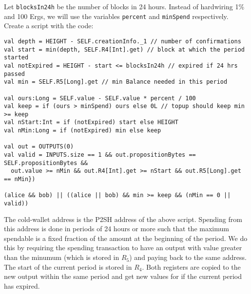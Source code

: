 \documentclass[11pt]{article}
\begin{document}
Let \texttt{blocksIn24h} be the number of blocks in 24 hours. Instead of hardwiring 1\% and 100 Ergs, we will use the variables \texttt{percent} and \texttt{minSpend} respectively. Create a script with the code:
\begin{verbatim}
val depth = HEIGHT - SELF.creationInfo._1 // number of confirmations
val start = min(depth, SELF.R4[Int].get) // block at which the period started
val notExpired = HEIGHT - start <= blocksIn24h // expired if 24 hrs passed
val min = SELF.R5[Long].get // min Balance needed in this period

val ours:Long = SELF.value - SELF.value * percent / 100
val keep = if (ours > minSpend) ours else 0L // topup should keep min >= keep
val nStart:Int = if (notExpired) start else HEIGHT
val nMin:Long = if (notExpired) min else keep

val out = OUTPUTS(0)  
val valid = INPUTS.size == 1 && out.propositionBytes == SELF.propositionBytes &&
  out.value >= nMin && out.R4[Int].get >= nStart && out.R5[Long].get == nMin})
    
(alice && bob) || ((alice || bob) && min >= keep && (nMin == 0 || valid))
\end{verbatim}

The cold-wallet address is the P2SH address of the above script. 
Spending from this address is done in periods of 24 hours or more such that the maximum spendable is a fixed fraction of the amount at the beginning of the period. We do this by requiring the spending transaction to have an output with value greater than the minumum (which is stored in $R_5$) and paying back to the same address. The start of the current period is stored in $R_4$. Both registers are copied to the new output within the same period and get new values for if the current period has expired.


%
%
\end{document}
